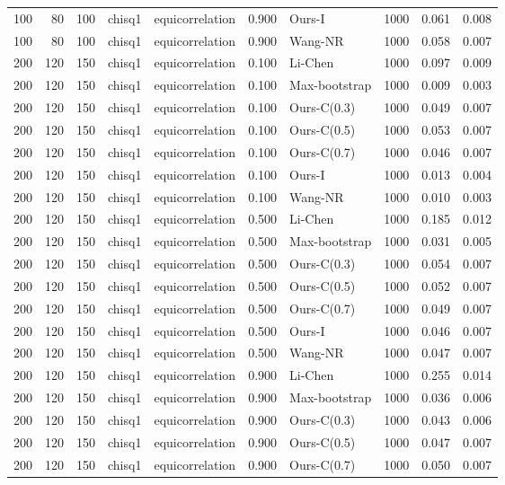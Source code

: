 \begin{tabular}{rrrllrlrrr}
100 & 80 & 100 & chisq1 & equicorrelation & 0.900 & Ours-I & 1000 & 0.061 & 0.008 \\
100 & 80 & 100 & chisq1 & equicorrelation & 0.900 & Wang-NR & 1000 & 0.058 & 0.007 \\
200 & 120 & 150 & chisq1 & equicorrelation & 0.100 & Li-Chen & 1000 & 0.097 & 0.009 \\
200 & 120 & 150 & chisq1 & equicorrelation & 0.100 & Max-bootstrap & 1000 & 0.009 & 0.003 \\
200 & 120 & 150 & chisq1 & equicorrelation & 0.100 & Ours-C(0.3) & 1000 & 0.049 & 0.007 \\
200 & 120 & 150 & chisq1 & equicorrelation & 0.100 & Ours-C(0.5) & 1000 & 0.053 & 0.007 \\
200 & 120 & 150 & chisq1 & equicorrelation & 0.100 & Ours-C(0.7) & 1000 & 0.046 & 0.007 \\
200 & 120 & 150 & chisq1 & equicorrelation & 0.100 & Ours-I & 1000 & 0.013 & 0.004 \\
200 & 120 & 150 & chisq1 & equicorrelation & 0.100 & Wang-NR & 1000 & 0.010 & 0.003 \\
200 & 120 & 150 & chisq1 & equicorrelation & 0.500 & Li-Chen & 1000 & 0.185 & 0.012 \\
200 & 120 & 150 & chisq1 & equicorrelation & 0.500 & Max-bootstrap & 1000 & 0.031 & 0.005 \\
200 & 120 & 150 & chisq1 & equicorrelation & 0.500 & Ours-C(0.3) & 1000 & 0.054 & 0.007 \\
200 & 120 & 150 & chisq1 & equicorrelation & 0.500 & Ours-C(0.5) & 1000 & 0.052 & 0.007 \\
200 & 120 & 150 & chisq1 & equicorrelation & 0.500 & Ours-C(0.7) & 1000 & 0.049 & 0.007 \\
200 & 120 & 150 & chisq1 & equicorrelation & 0.500 & Ours-I & 1000 & 0.046 & 0.007 \\
200 & 120 & 150 & chisq1 & equicorrelation & 0.500 & Wang-NR & 1000 & 0.047 & 0.007 \\
200 & 120 & 150 & chisq1 & equicorrelation & 0.900 & Li-Chen & 1000 & 0.255 & 0.014 \\
200 & 120 & 150 & chisq1 & equicorrelation & 0.900 & Max-bootstrap & 1000 & 0.036 & 0.006 \\
200 & 120 & 150 & chisq1 & equicorrelation & 0.900 & Ours-C(0.3) & 1000 & 0.043 & 0.006 \\
200 & 120 & 150 & chisq1 & equicorrelation & 0.900 & Ours-C(0.5) & 1000 & 0.047 & 0.007 \\
200 & 120 & 150 & chisq1 & equicorrelation & 0.900 & Ours-C(0.7) & 1000 & 0.050 & 0.007 \\

\end{tabular}

